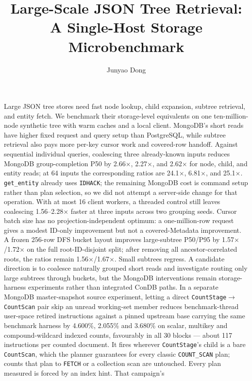 \documentclass[10pt]{article}
\title{\sffamily\bfseries Large-Scale JSON Tree Retrieval:\\
A Single-Host Storage Microbenchmark}
\author{Junyao Dong}
\date{}
\newcommand{\code}[1]{\texttt{#1}}
\renewenvironment{abstract}{%
  \par\medskip\noindent{\bfseries\abstractname.}\enspace\ignorespaces
}{\par\medskip}
\begin{document}
\maketitle

\begin{abstract}
Large JSON tree stores need fast node lookup, child expansion, subtree
retrieval, and entity fetch. We benchmark their storage-level equivalents on
one ten-million-node synthetic tree with warm caches and a local client.
MongoDB's short reads have higher fixed request and query setup than
PostgreSQL, while subtree retrieval also pays more per-key cursor work and
covered-row handoff. Against sequential individual
queries, coalescing three already-known inputs reduces MongoDB
group-completion P50 by 2.66$\times$, 2.27$\times$, and 2.62$\times$ for node,
child, and entity reads; at 64 inputs the corresponding ratios are
24.1$\times$, 6.81$\times$, and 25.1$\times$.
\code{get\_entity} already uses \code{IDHACK}; the remaining MongoDB
cost is command setup rather than plan selection, so we did not attempt a
server-side change for that operation. With at most 16 client workers,
a threaded control still leaves coalescing 1.56--2.28$\times$ faster at three
inputs across two grouping seeds. Cursor batch size has no
projection-independent optimum: a one-million-row request gives a modest
ID-only improvement but not a covered-Metadata improvement. A frozen 256-row
DFS bucket layout improves large-subtree P50/P95 by
1.57$\times$/1.72$\times$ on the full root-ID-disjoint split; after removing
all ancestor-correlated roots, the ratios remain
1.56$\times$/1.67$\times$. Small subtrees regress. A candidate direction is
to coalesce naturally grouped short reads and investigate routing only large
subtrees through buckets, but the MongoDB interventions remain storage-harness
experiments rather than integrated ConDB paths. In a separate MongoDB
master-snapshot source experiment, letting a direct
\code{CountStage}$\rightarrow$\code{CountScan} pair skip an unread working-set
member reduces benchmark-thread user-space retired instructions against a pinned
upstream base carrying the same benchmark harness by 4.600\%, 2.055\% and
3.680\% on scalar, multikey and compound-wildcard indexed counts, favourably in
all 30 blocks --- about 117 instructions per counted document. It fires wherever
\code{CountStage}'s child is a bare \code{CountScan}, which the planner
guarantees for every classic \code{COUNT\_SCAN} plan; counts that plan to
\code{FETCH} or a collection scan are untouched. Every plan measured is forced
by an index hint. That campaign's

\end{abstract}
\end{document}
